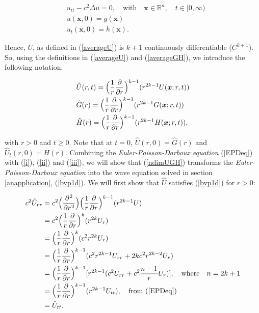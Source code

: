 \documentclass[a4paper, 12pt]{article}
\numberwithin{equation}{section}
\begin{document}
\begin{equation} \label{ndimeq}
    \begin{aligned}
        &u_{tt}-c^2\Delta u =0, \quad \textrm{with} \quad \boldsymbol{x} \in \mathbb{R}^n, \quad t \in [0, \infty)\\
        &u(\boldsymbol{x}, 0)=g(\boldsymbol{x})\\
        &u_t(\boldsymbol{x},0)=h(\boldsymbol{x}).
    \end{aligned}
\end{equation} 

Hence, $U$, as defined in (\ref{averageU}) is $k+1$ continuously differentiable ($C^{k+1}$). So, using the definitions in (\ref{averageU}) and (\ref{averageGH}), we 
introduce the following notation:

\begin{equation} \label{ndimUGH}
    \begin{aligned}
        &\hat{U}(r,t)=\Big(\frac{1}{r} \diffp[1]{}{r} \Big)^{k-1} (r^{2k-1}U(\boldsymbol{x};r,t))\\
        &\hat{G}(r)=\Big(\frac{1}{r} \diffp[1]{}{r} \Big)^{k-1} (r^{2k-1}G(\boldsymbol{x};r,t))\\
        &\hat{H}(r)=\Big(\frac{1}{r} \diffp[1]{}{r} \Big)^{k-1} (r^{2k-1}H(\boldsymbol{x};r,t)),
    \end{aligned}
\end{equation}

with $r>0$ and $t \ge 0$. Note that at $t=0$, $\hat{U}(r,0)=\hat{G}(r)$ and $\hat{U}_t(r,0)=H(r)$. Combining the \emph{Euler-Poisson-Darboux equation} (\ref{EPDeq}) with 
(\ref{i}), (\ref{ii}) and (\ref{iii}), we will show that (\ref{ndimUGH}) transforms the \emph{Euler-Poisson-Darboux equation} into the wave equation solved in section \ref{anapplication}, (\ref{bvp1d}).
We will first show that $\hat{U}$ satisfies (\ref{bvp1d}) for $r>0$:

\begin{equation*}
    \begin{aligned}
        c^2\hat{U}_{rr}&=c^2\Big(\diffp[2]{}{r}\Big)\Big(\frac{1}{r} \diffp[1]{}{r}\Big)^{k-1}(r^{2k-1}U)\\
        &=c^2\Big(\frac{1}{r} \diffp[1]{}{r}\Big)^k(r^{2k}U_r)\\
        &=\Big(\frac{1}{r} \diffp[1]{}{r}\Big)^k(c^2r^{2k}U_r)\\
        &=\Big(\frac{1}{r} \diffp[1]{}{r}\Big)^{k-1}(c^2r^{2k-1}U_{rr}+2kc^2r^{2k-2}U_r)\\
        &=\Big(\frac{1}{r} \diffp[1]{}{r}\Big)^{k-1}[r^{2k-1}(c^2U_{rr}+c^2\frac{n-1}{r}U_r)], \quad \textrm{where} \quad n=2k+1\\
        &=\Big(\frac{1}{r} \diffp[1]{}{r}\Big)^{k-1}(r^{2k-1}U_{tt}), \quad \textrm{from (\ref{EPDeq})}\\
        &=\hat{U}_{tt}.
    \end{aligned}
\end{equation*}
\end{document}
